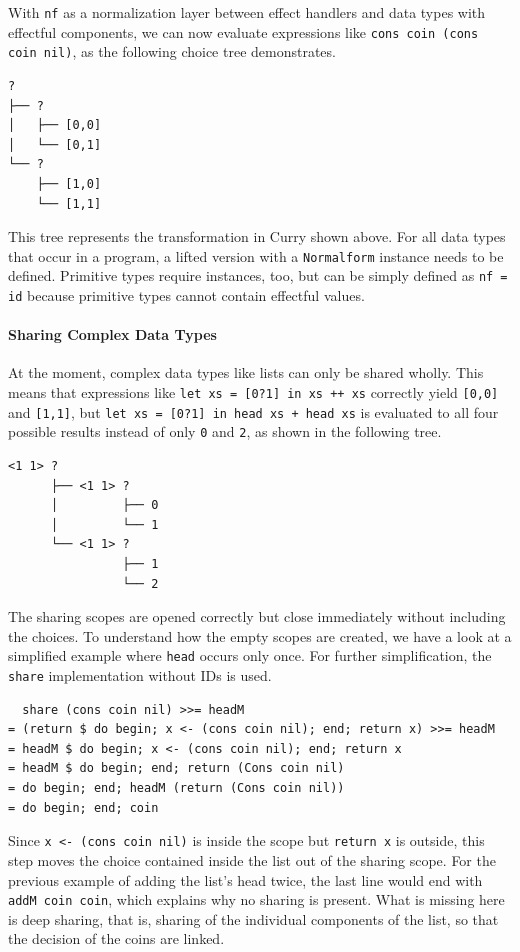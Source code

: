 \documentclass[a4paper, 11pt, fleqn, twoside, abstract=on]{scrreprt}
\newcommand{\hinl}[1]{\texttt{#1}}
\begin{document}
With \hinl{nf} as a normalization layer between effect handlers and data types with effectful components, we can now evaluate expressions like \hinl{cons coin (cons coin nil)}, as the following choice tree demonstrates.

\begin{verbatim}
? 
├── ? 
│   ├── [0,0]
│   └── [0,1]
└── ? 
    ├── [1,0]
    └── [1,1]
\end{verbatim}
\noindent
This tree represents the transformation in Curry shown above.
For all data types that occur in a program, a lifted version with a \hinl{Normalform} instance needs to be defined.
Primitive types require instances, too, but can be simply defined as \hinl{nf = id} because primitive types cannot contain effectful values.

\paragraph{Sharing Complex Data Types}
At the moment, complex data types like lists can only be shared wholly.
This means that expressions like \hinl{let xs = [0?1] in xs ++ xs} correctly yield \hinl{[0,0]} and \hinl{[1,1]}, but \hinl{let xs = [0?1] in head xs + head xs} is evaluated to all four possible results instead of only \hinl{0} and \hinl{2}, as shown in the following tree.

\begin{verbatim}
<1 1> ? 
      ├── <1 1> ? 
      │         ├── 0
      │         └── 1
      └── <1 1> ? 
                ├── 1
                └── 2
\end{verbatim}
\noindent
The sharing scopes are opened correctly but close immediately without including the choices.
To understand how the empty scopes are created, we have a look at a simplified example where \hinl{head} occurs only once.
For further simplification, the \hinl{share} implementation without IDs is used.

\begin{verbatim}
  share (cons coin nil) >>= headM
= (return $ do begin; x <- (cons coin nil); end; return x) >>= headM
= headM $ do begin; x <- (cons coin nil); end; return x
= headM $ do begin; end; return (Cons coin nil)
= do begin; end; headM (return (Cons coin nil))
= do begin; end; coin
\end{verbatim}
\noindent
Since \hinl{x <- (cons coin nil)} is inside the scope but \hinl{return x} is outside, this step moves the choice contained inside the list out of the sharing scope.
For the previous example of adding the list's head twice, the last line would end with \hinl{addM coin coin}, which explains why no sharing is present.
What is missing here is deep sharing, that is, sharing of the individual components of the list, so that the decision of the coins are linked.
\end{document}

